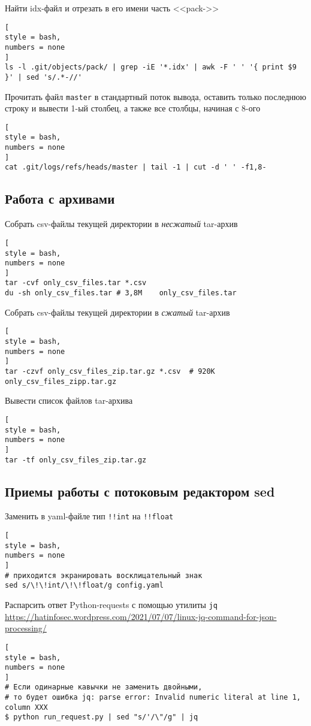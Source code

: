 \documentclass[%
	11pt,
	a4paper,
	utf8,
		]{article}
\begin{document}
Найти idx-файл и отрезать в его имени часть <<pack->>

\begin{lstlisting}[
style = bash,
numbers = none
]
ls -l .git/objects/pack/ | grep -iE '*.idx' | awk -F ' ' '{ print $9 }' | sed 's/.*-//'
\end{lstlisting}

Прочитать файл \texttt{master} в стандартный поток вывода, оставить только последнюю строку и вывести 1-ый столбец, а также все столбцы, начиная с 8-ого
\begin{lstlisting}[
style = bash,
numbers = none
]
cat .git/logs/refs/heads/master | tail -1 | cut -d ' ' -f1,8-
\end{lstlisting}


\subsection{Работа с архивами}

Собрать csv-файлы текущей директории в \emph{несжатый} tar-архив 
\begin{lstlisting}[
style = bash,
numbers = none	
]
tar -cvf only_csv_files.tar *.csv
du -sh only_csv_files.tar # 3,8M	only_csv_files.tar
\end{lstlisting}

Собрать csv-файлы текущей директории в \emph{сжатый} tar-архив 
\begin{lstlisting}[
style = bash,
numbers = none	
]
tar -czvf only_csv_files_zip.tar.gz *.csv  # 920K	only_csv_files_zipp.tar.gz
\end{lstlisting}

Вывести список файлов tar-архива
\begin{lstlisting}[
style = bash,
numbers = none	
]
tar -tf only_csv_files_zip.tar.gz
\end{lstlisting}

\subsection{Приемы работы с потоковым редактором sed}

Заменить в yaml-файле тип \verb|!!int| на \verb|!!float|
\begin{lstlisting}[
style = bash,
numbers = none	
]
# приходится экранировать восклицательный знак
sed s/\!\!int/\!\!float/g config.yaml
\end{lstlisting}

Распарсить ответ Python-requests с помощью утилиты \verb*|jq| \url{https://hatinfosec.wordpress.com/2021/07/07/linux-jq-command-for-json-processing/}
\begin{lstlisting}[
style = bash,
numbers = none
]
# Если одинарные кавычки не заменить двойными,
# то будет ошибка jq: parse error: Invalid numeric literal at line 1, column XXX
$ python run_request.py | sed "s/'/\"/g" | jq
\end{lstlisting}
\end{document}
